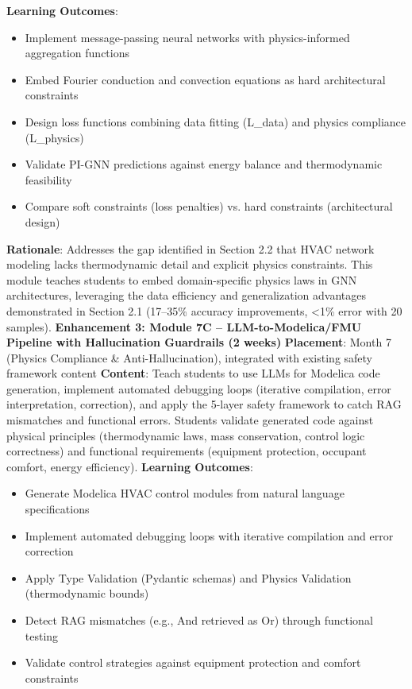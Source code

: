 \documentclass[12pt,a4paper]{article}
\begin{document}
\textbf{Learning Outcomes}:
\begin{itemize}
  \item Implement message-passing neural networks with physics-informed aggregation functions
  \item Embed Fourier conduction and convection equations as hard architectural constraints
    \item Design loss functions combining data fitting (L\_data)
      and physics compliance (L\_physics)
  \item Validate PI-GNN predictions against energy balance and thermodynamic feasibility
  \item Compare soft constraints (loss penalties) vs. hard constraints (architectural design)
\end{itemize}
\textbf{Rationale}: Addresses the gap identified in Section 2.2 that HVAC network modeling lacks thermodynamic detail and explicit physics constraints. This module teaches students to embed domain-specific physics laws in GNN architectures, leveraging the data efficiency and generalization advantages demonstrated in Section 2.1 (17--35\% accuracy improvements, <1\% error with 20 samples).
\textbf{Enhancement 3: Module 7C -- LLM-to-Modelica/FMU Pipeline with Hallucination Guardrails (2 weeks)}
\textbf{Placement}: Month 7 (Physics Compliance \& Anti-Hallucination), integrated with existing safety framework content
\textbf{Content}: Teach students to use LLMs for Modelica code generation, implement automated debugging loops (iterative compilation, error interpretation, correction), and apply the 5-layer safety framework to catch RAG mismatches and functional errors. Students validate generated code against physical principles (thermodynamic laws, mass conservation, control logic correctness) and functional requirements (equipment protection, occupant comfort, energy efficiency).
\textbf{Learning Outcomes}:
\begin{itemize}
  \item Generate Modelica HVAC control modules from natural language specifications
  \item Implement automated debugging loops with iterative compilation and error correction
  \item Apply Type Validation (Pydantic schemas) and Physics Validation (thermodynamic bounds)
  \item Detect RAG mismatches (e.g., And retrieved as Or) through functional testing
  \item Validate control strategies against equipment protection and comfort constraints
\end{itemize}
\end{document}
